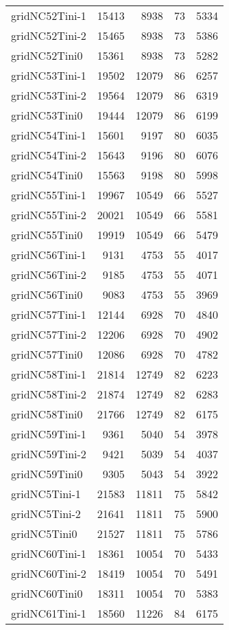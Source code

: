 \begin{longtable}{lrrrr}
gridNC52Tini-1 & 15413 & 8938 & 73 & 5334 \\
gridNC52Tini-2 & 15465 & 8938 & 73 & 5386 \\
gridNC52Tini0 & 15361 & 8938 & 73 & 5282 \\
gridNC53Tini-1 & 19502 & 12079 & 86 & 6257 \\
gridNC53Tini-2 & 19564 & 12079 & 86 & 6319 \\
gridNC53Tini0 & 19444 & 12079 & 86 & 6199 \\
gridNC54Tini-1 & 15601 & 9197 & 80 & 6035 \\
gridNC54Tini-2 & 15643 & 9196 & 80 & 6076 \\
gridNC54Tini0 & 15563 & 9198 & 80 & 5998 \\
gridNC55Tini-1 & 19967 & 10549 & 66 & 5527 \\
gridNC55Tini-2 & 20021 & 10549 & 66 & 5581 \\
gridNC55Tini0 & 19919 & 10549 & 66 & 5479 \\
gridNC56Tini-1 & 9131 & 4753 & 55 & 4017 \\
gridNC56Tini-2 & 9185 & 4753 & 55 & 4071 \\
gridNC56Tini0 & 9083 & 4753 & 55 & 3969 \\
gridNC57Tini-1 & 12144 & 6928 & 70 & 4840 \\
gridNC57Tini-2 & 12206 & 6928 & 70 & 4902 \\
gridNC57Tini0 & 12086 & 6928 & 70 & 4782 \\
gridNC58Tini-1 & 21814 & 12749 & 82 & 6223 \\
gridNC58Tini-2 & 21874 & 12749 & 82 & 6283 \\
gridNC58Tini0 & 21766 & 12749 & 82 & 6175 \\
gridNC59Tini-1 & 9361 & 5040 & 54 & 3978 \\
gridNC59Tini-2 & 9421 & 5039 & 54 & 4037 \\
gridNC59Tini0 & 9305 & 5043 & 54 & 3922 \\
gridNC5Tini-1 & 21583 & 11811 & 75 & 5842 \\
gridNC5Tini-2 & 21641 & 11811 & 75 & 5900 \\
gridNC5Tini0 & 21527 & 11811 & 75 & 5786 \\
gridNC60Tini-1 & 18361 & 10054 & 70 & 5433 \\
gridNC60Tini-2 & 18419 & 10054 & 70 & 5491 \\
gridNC60Tini0 & 18311 & 10054 & 70 & 5383 \\
gridNC61Tini-1 & 18560 & 11226 & 84 & 6175 \\

\end{longtable}
